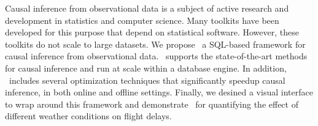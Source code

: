 Causal inference from observational data is a subject of active research and development in statistics and computer science.
Many toolkits have been developed for this purpose that depend on statistical software.
However, these toolkits do not scale to large datasets.
We propose \GSQL\ a SQL-based framework for causal inference from observational data.
\GSQL\ supports the state-of-the-art methods for causal inference and run at scale within a database engine.
In addition, \GSQL\ includes several optimization techniques that significantly speedup causal inference, in both online and offline settings.
Finally, we desined a visual interface to wrap around this framework and demonstrate \GSQL\ for quantifying the effect of different weather conditions on flight delays. 